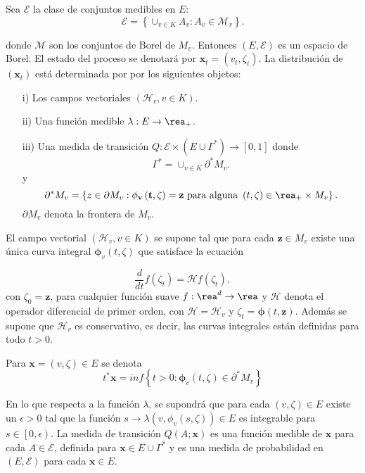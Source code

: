 Sea $\mathcal{E}$ la clase de conjuntos medibles en $E$:
\[\mathcal{E}=\left\{\cup_{v\in K}A_{v}:A_{v}\in \mathcal{M}_{v}\right\}.\]

donde $\mathcal{M}$ son los conjuntos de Borel de $M_{v}$.
Entonces $\left(E,\mathcal{E}\right)$ es un espacio de Borel. El
estado del proceso se denotar\'a por
$\mathbf{x}_{t}=\left(v_{t},\zeta_{t}\right)$. La distribuci\'on
de $\left(\mathbf{x}_{t}\right)$ est\'a determinada por por los
siguientes objetos:

\begin{itemize}
\item[i)] Los campos vectoriales $\left(\mathcal{H}_{v},v\in
K\right)$. \item[ii)] Una funci\'on medible $\lambda:E\rightarrow
\rea_{+}$. \item[iii)] Una medida de transici\'on
$Q:\mathcal{E}\times\left(E\cup\Gamma^{*}\right)\rightarrow\left[0,1\right]$
donde
\begin{equation}
\Gamma^{*}=\cup_{v\in K}\partial^{*}M_{v}.
\end{equation}
y
\begin{equation}
\partial^{*}M_{v}=\left\{z\in\partial M_{v}:\mathbf{\mathbf{\phi}_{v}\left(t,\zeta\right)=\mathbf{z}}\textrm{ para alguna }\left(t,\zeta\right)\in\rea_{+}\times M_{v}\right\}.
\end{equation}
$\partial M_{v}$ denota  la frontera de $M_{v}$.
\end{itemize}

El campo vectorial $\left(\mathcal{H}_{v},v\in K\right)$ se supone
tal que para cada $\mathbf{z}\in M_{v}$ existe una \'unica curva
integral $\mathbf{\phi}_{v}\left(t,\zeta\right)$ que satisface la
ecuaci\'on

\begin{equation}
\frac{d}{dt}f\left(\zeta_{t}\right)=\mathcal{H}f\left(\zeta_{t}\right),
\end{equation}
con $\zeta_{0}=\mathbf{z}$, para cualquier funci\'on suave
$f:\rea^{d}\rightarrow\rea$ y $\mathcal{H}$ denota el operador
diferencial de primer orden, con $\mathcal{H}=\mathcal{H}_{v}$ y
$\zeta_{t}=\mathbf{\phi}\left(t,\mathbf{z}\right)$. Adem\'as se
supone que $\mathcal{H}_{v}$ es conservativo, es decir, las curvas
integrales est\'an definidas para todo $t>0$.

Para $\mathbf{x}=\left(v,\zeta\right)\in E$ se denota
\[t^{*}\mathbf{x}=inf\left\{t>0:\mathbf{\phi}_{v}\left(t,\zeta\right)\in\partial^{*}M_{v}\right\}\]

En lo que respecta a la funci\'on $\lambda$, se supondr\'a que
para cada $\left(v,\zeta\right)\in E$ existe un $\epsilon>0$ tal
que la funci\'on
$s\rightarrow\lambda\left(v,\phi_{v}\left(s,\zeta\right)\right)\in
E$ es integrable para $s\in\left[0,\epsilon\right)$. La medida de
transici\'on $Q\left(A;\mathbf{x}\right)$ es una funci\'on medible
de $\mathbf{x}$ para cada $A\in\mathcal{E}$, definida para
$\mathbf{x}\in E\cup\Gamma^{*}$ y es una medida de probabilidad en
$\left(E,\mathcal{E}\right)$ para cada $\mathbf{x}\in E$.

